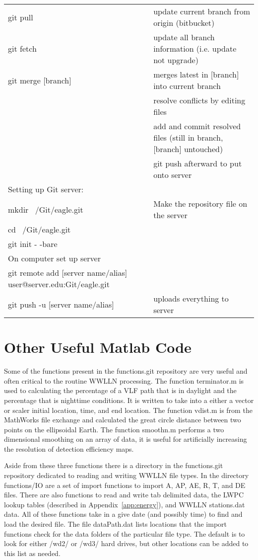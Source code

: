 \begin{landscape}
\begin{center}
\begin{longtable}{|p{4in}|p{4in}|}
git pull & update current branch from origin (bitbucket) \\
git fetch & update all branch information (i.e. update not upgrade) \\
git merge [branch] & merges latest in [branch] into current branch \\
& resolve conflicts by editing files \\
& add and commit resolved files (still in branch, [branch] untouched) \\
& git push afterward to put onto server \\
Setting up Git server: & \\
mkdir ~/Git/eagle.git & Make the repository file on the server \\
cd ~/Git/eagle.git & \\
git init - -bare & \\
On computer set up server & \\
git remote add [server name/alias] user@server.edu:Git/eagle.git & \\
git push -u [server name/alias] & uploads everything to server 
\label{label}
\end{longtable}
\end{center}
\end{landscape}

\section{Other Useful Matlab Code}

Some of the functions present in the functions.git repository are very useful and often critical to the routine WWLLN processing.
The function terminator.m is used to calculating the percentage of a VLF path that is in daylight and the percentage that is nighttime conditions.
It is written to take into a either a vector or scaler initial location, time, and end location.
The function vdist.m is from the MathWorks file exchange and calculated the great circle distance between two points on the ellipsoidal Earth.
The function smoothn.m performs a two dimensional smoothing on an array of data, it is useful for artificially increasing the resolution of detection efficiency maps.

Aside from these three functions there is a directory in the functions.git repository dedicated to reading and writing WWLLN file types.
In the directory functions/IO are a set of import functions to import A, AP, AE, R, T, and DE files.
There are also functions to read and write tab delimited data, the LWPC lookup tables (described in Appendix~\ref{app:energy}), and WWLLN stations.dat data.
All of these functions take in a give date (and possibly time) to find and load the desired file.
The file dataPath.dat lists locations that the import functions check for the data folders of the particular file type.
The default is to look for either /wd2/ or /wd3/ hard drives, but other locations can be added to this list as needed.
